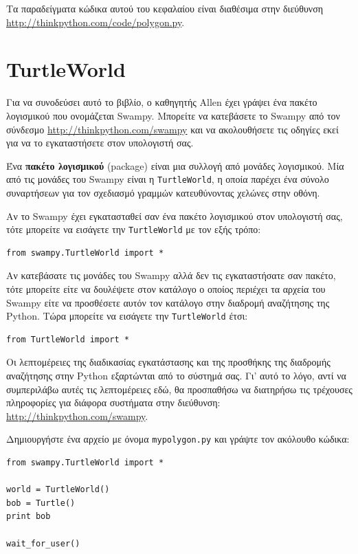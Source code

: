 \documentclass[10pt]{book}
\begin{document}
Τα παραδείγματα κώδικα αυτού του κεφαλαίου είναι διαθέσιμα στην διεύθυνση 
\url{http://thinkpython.com/code/polygon.py}.


\section{TurtleWorld}
\label{turtleworld}

Για να συνοδεύσει αυτό το βιβλίο, ο καθηγητής Allen έχει γράψει ένα πακέτο λογισμικού που ονομάζεται Swampy. Μπορείτε να κατεβάσετε το Swampy από τον σύνδεσμο \url{http://thinkpython.com/swampy} και να ακολουθήσετε τις οδηγίες εκεί για να το εγκαταστήσετε στον υπολογιστή σας.

Ένα {\bf πακέτο λογισμικού} (package) είναι μια συλλογή από μονάδες λογισμικού. Μία από τις μονάδες του Swampy είναι η {\tt TurtleWorld}, η οποία παρέχει ένα σύνολο συναρτήσεων για τον σχεδιασμό γραμμών κατευθύνοντας χελώνες στην οθόνη.

Αν το Swampy έχει εγκατασταθεί σαν ένα πακέτο λογισμικού στον υπολογιστή σας, 
τότε μπορείτε να εισάγετε την {\tt TurtleWorld} με τον εξής τρόπο:


\begin{verbatim}
from swampy.TurtleWorld import *
\end{verbatim}


Αν κατεβάσατε τις μονάδες του Swampy αλλά δεν τις εγκαταστήσατε σαν πακέτο, τότε μπορείτε είτε να δουλέψετε στον κατάλογο ο οποίος περιέχει τα αρχεία του Swampy είτε να προσθέσετε αυτόν τον κατάλογο στην διαδρομή αναζήτησης της  Python. Τώρα μπορείτε να εισάγετε την {\tt TurtleWorld} έτσι:


\begin{verbatim}
from TurtleWorld import *
\end{verbatim}


Οι λεπτομέρειες της διαδικασίας εγκατάστασης και της προσθήκης της διαδρομής
αναζήτησης στην  Python  εξαρτώνται από το σύστημά σας. Γι' αυτό το λόγο, αντί να συμπεριλάβω αυτές τις λεπτομέρειες εδώ, θα προσπαθήσω να διατηρήσω τις τρέχουσες πληροφορίες για διάφορα συστήματα στην διεύθυνση: \url{http://thinkpython.com/swampy}.

Δημιουργήστε ένα αρχείο με όνομα {\tt mypolygon.py} και γράψτε 
τον ακόλουθο κώδικα:

\begin{verbatim}
from swampy.TurtleWorld import *

world = TurtleWorld()
bob = Turtle()
print bob

wait_for_user()
\end{verbatim}
%
\end{document}
